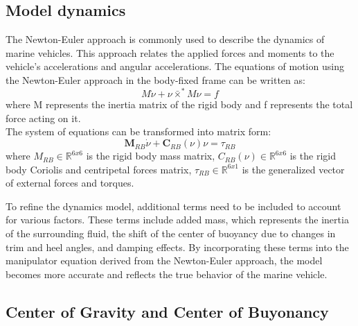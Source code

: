\subsection*{Model dynamics}

    The Newton-Euler approach is commonly used to describe the dynamics of marine vehicles.
    This approach relates the applied forces and moments to the vehicle's accelerations and angular accelerations.
    The equations of motion using the Newton-Euler approach in the body-fixed frame can be written as:
    $$
    M\dot\nu+\nu\bar{\times}^*M\nu=f
    $$
    where M represents the inertia matrix of the rigid body and 
    f represents the total force acting on it.\\
    The system of equations can be transformed into matrix form:
    $$
     \mathbf{M}_{R B} \dot{\nu}+\mathbf{C}_{R B}(\nu) \nu
    =\tau_{R B}
    $$
    where
    $M_{R B} \in \mathbb{R}^{6 x 6}$ is the rigid body mass matrix,
    $C_{R B}(\nu) \in \mathbb{R}^{6 x 6}$ is the rigid body Coriolis and centripetal forces matrix,
    $\tau_{R B} \in \mathbb{R}^{6 x 1}$ is the generalized vector of external forces and torques.
    
    To refine the dynamics model, additional terms need to be included to account for various factors. 
    These terms include added mass, which represents the inertia of the surrounding fluid, 
    the shift of the center of buoyancy due to changes in trim and heel angles, 
    and damping effects. 
    By incorporating these terms into the manipulator equation derived from the Newton-Euler approach, 
    the model becomes more accurate and reflects the true behavior of the marine vehicle.    

\subsection*{Center of Gravity and Center of Buyonancy}
    
